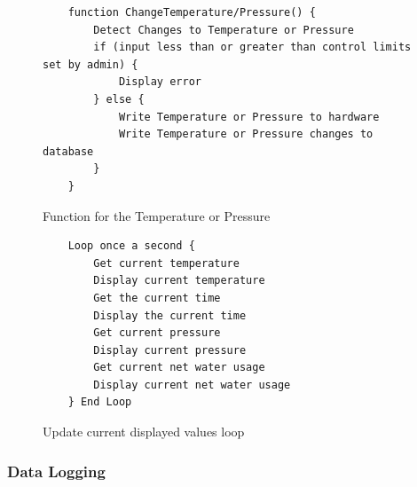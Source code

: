 \documentclass[12pt, a4paper]{article}
\begin{document}
                    \endgroup
                    \footnotesize
                    \begin{figure}[H]
                        \begin{lstlisting}
    function ChangeTemperature/Pressure() {
        Detect Changes to Temperature or Pressure
        if (input less than or greater than control limits set by admin) {
            Display error
        } else {
            Write Temperature or Pressure to hardware
            Write Temperature or Pressure changes to database
        }
    }                                                                
                        \end{lstlisting}
                        \caption{Function for the Temperature or Pressure}
                    \end{figure}
                    \normalsize
                    \footnotesize
                    \begin{figure}[H]
                        \begin{lstlisting}
    Loop once a second {
        Get current temperature
        Display current temperature
        Get the current time
        Display the current time
        Get current pressure
        Display current pressure
        Get current net water usage
        Display current net water usage
    } End Loop                                                                                          
                        \end{lstlisting}
                        \caption{Update current displayed values loop}
                    \end{figure}
                    \normalsize
            \subsubsection{Data Logging}
\end{document}
